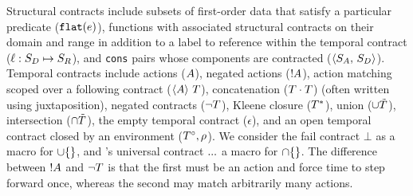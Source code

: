 Structural contracts include subsets of first-order data that satisfy a particular predicate (${\tt flat}(e)$), functions with associated structural contracts on their domain and range in addition to a label to reference within the temporal contract ($\ell : S_D \mapsto S_R$), and {\tt cons} pairs whose components are contracted ($\langle S_A,\, S_D\rangle$).
Temporal contracts include actions ($A$), negated actions (${}! A$), action matching scoped over a following contract ($\langle A\rangle\ T$), concatenation ($T \cdot T$) (often written using juxtaposition), negated contracts ($\neg T$), Kleene closure ($T^*$), union ($\cup \tilde{T}$), intersection ($\cap \tilde{T}$), the empty temporal contract ($\epsilon$), and an open temporal contract closed by an environment ($T^\circ, \rho$).
%
We consider the fail contract $\bot$ as a macro for $\cup \{\}$, and \dfm's universal contract ${\tt ...}$ a macro for $\cap \{\}$.
%
The difference between ${}! A$ and $\neg T$ is that the first must be an action and force time to step forward once, whereas the second may match arbitrarily many actions.


